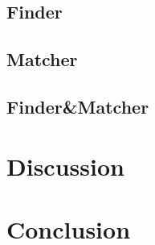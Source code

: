 \documentclass{article}
\begin{document}
\subsection{Finder}

\subsection{Matcher}

\subsection{Finder\&Matcher}


\section{Discussion}


\section{Conclusion}





\newpage





\end{document}
